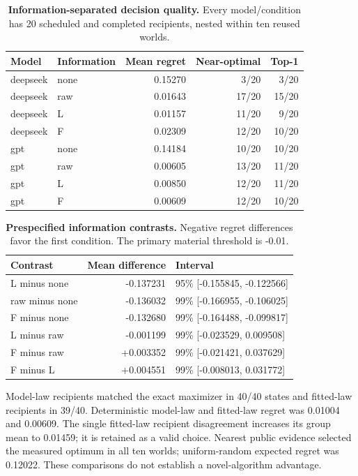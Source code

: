 \documentclass[10pt,twocolumn]{article}
\begin{document}
\begin{table}[t]
\centering
\caption{\textbf{Information-separated decision quality.} Every model/condition has 20 scheduled and completed recipients, nested within ten reused worlds.}
\begin{tabular}{@{}llrrr@{}}
\toprule
Model & Information & Mean regret & Near-optimal & Top-1 \\
\midrule
deepseek & none & 0.15270 & 3/20 & 3/20 \\
deepseek & raw & 0.01643 & 17/20 & 15/20 \\
deepseek & L & 0.01157 & 11/20 & 9/20 \\
deepseek & F & 0.02309 & 12/20 & 10/20 \\
gpt & none & 0.14184 & 10/20 & 10/20 \\
gpt & raw & 0.00605 & 13/20 & 11/20 \\
gpt & L & 0.00850 & 12/20 & 11/20 \\
gpt & F & 0.00609 & 12/20 & 10/20 \\
\bottomrule
\end{tabular}
\end{table}

\begin{table}[t]
\centering
\caption{\textbf{Prespecified information contrasts.} Negative regret differences favor the first condition. The primary material threshold is -0.01.}
\begin{tabular}{@{}lrl@{}}
\toprule
Contrast & Mean difference & Interval \\
\midrule
L minus none & -0.137231 & 95\% [-0.155845, -0.122566] \\
raw minus none & -0.136032 & 99\% [-0.166955, -0.106025] \\
F minus none & -0.132680 & 99\% [-0.164488, -0.099817] \\
L minus raw & -0.001199 & 99\% [-0.023529, 0.009508] \\
F minus raw & +0.003352 & 99\% [-0.021421, 0.037629] \\
F minus L & +0.004551 & 99\% [-0.008013, 0.031772] \\
\bottomrule
\end{tabular}
\end{table}

Model-law recipients matched the exact maximizer in 40/40 states and
fitted-law recipients in 39/40. Deterministic model-law and fitted-law
regret was 0.01004 and 0.00609. The single fitted-law recipient
disagreement increases its group mean to 0.01459; it is retained as a
valid choice. Nearest public evidence selected the measured optimum in
all ten worlds; uniform-random expected regret was 0.12022. These
comparisons do not establish a novel-algorithm advantage.
\end{document}
